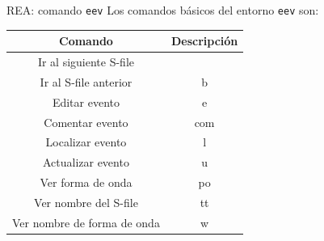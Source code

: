\documentclass[11pt]{beamer}
\begin{document}
\begin{frame}{REA: comando {\tt eev}}
Los comandos básicos del entorno {\tt eev} son: 
\begin{table}
\begin{tabular}{|c|c|}
\hline 
{\bf Comando}  & {\bf Descripción} \\ 
\hline 
Ir al siguiente S-file & \keys{\return} \\ 
\hline 
Ir al S-file anterior & b \keys{\return} \\ 
\hline 
Editar evento & e \keys{\return} \\ 
\hline 
Comentar evento & com \keys{\return} \\ 
\hline
Localizar evento & l \keys{\return} \\ 
\hline
Actualizar evento & u \keys{\return} \\ 
\hline
Ver forma de onda & po \keys{\return} \\ 
\hline
Ver nombre del S-file & tt \keys{\return} \\ 
\hline
Ver nombre de forma de onda & w \keys{\return} \\ 
\hline
\end{tabular} 
\end{table}
\end{frame}
\end{document}
